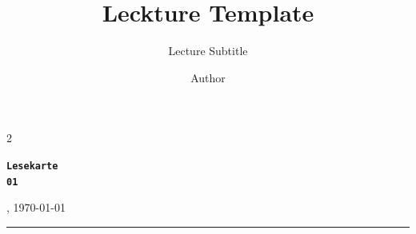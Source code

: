 \documentclass[10pt,A4]{scrartcl}
\title{Leckture Template}
\subtitle{Lecture Subtitle}
\author{Author}
\makeatletter
\renewcommand{\maketitle}{
\begin{flushleft}
    \textbf{\fontsize{30pt}{36pt}\selectfont\bfseries\sta \@title}
    
    {\huge \vspace{10pt} \textcolor{darkcol}{\@subtitle}}
    
    {\Large \vspace{10pt} \textcolor{darkcol}{\@author, \today}}
\end{flushleft}
}
\newcommand{\makelesekarte}[1]{
\begin{flushleft}
    \textcolor{darkcol}{\texttt{\huge\bfseries Lesekarte \\ \vspace{5pt} #1}}
\end{flushleft}
}
\makeatother
\begin{document}
\setlength{\columnsep}{2.2em}
\setlength{\columnseprule}{4pt}
\begin{paracol}{2}
\begin{leftcolumn}

\makelesekarte{01}

\end{leftcolumn}

\begin{rightcolumn}

\maketitle

\end{rightcolumn}
\end{paracol}

\begin{center}
\textcolor{darkcol}{\rule[0.9cm]{19cm}{3pt}}
\end{center}

\vspace{-25pt}
\end{document}
